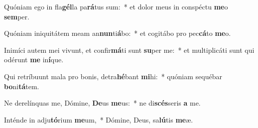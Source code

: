 \item Quóniam ego in fla\textbf{gél}la pa\textbf{rá}tus sum:~* et dolor meus in conspéctu \textbf{me}o \textbf{sem}per.
\item Quóniam iniquitátem meam an\textbf{nun}ti\textbf{á}bo:~* et cogitábo pro pec\textbf{cá}to \textbf{me}o.
\item Inimíci autem mei vivunt, et confir\textbf{má}ti sunt \textbf{su}per me:~* et multiplicáti sunt qui odérunt \textbf{me} in\textbf{í}que.
\item Qui retríbuunt mala pro bonis, detra\textbf{hé}bant \textbf{mi}hi:~* quóniam sequébar \textbf{bo}ni\textbf{tá}tem.
\item Ne derelínquas me, Dómine, \textbf{De}us \textbf{me}us:~* ne di\textbf{scés}seris \textbf{a} me.
\item Inténde in adju\textbf{tó}rium \textbf{me}um,~* Dómine, Deus, sa\textbf{lú}tis \textbf{me}æ.
